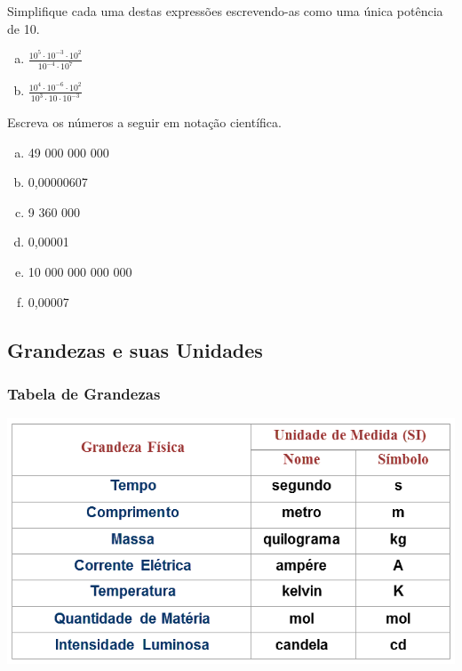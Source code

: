 \item Simplifique cada uma destas expressões escrevendo-as como uma única potência de 10.
\begin{multicols}{2}
\begin{enumerate}[a)]
	\item $\displaystyle\frac{10^5\cdot 10^{-3}\cdot 10^2}{10^{-4}\cdot 10^7}$
	\item $\displaystyle\frac{10^4\cdot 10^{-6}\cdot 10^2}{10^{3}\cdot 10\cdot 10^{-3}}$
\end{enumerate}
\end{multicols}

\item Escreva os números a seguir em notação científica.
\begin{multicols}{3}
\begin{enumerate}[a)]
	\item 49 000 000 000
	\item 0,00000607
	\item 9 360 000
	\item 0,00001
	\item 10 000 000 000 000
	\item 0,00007
\end{enumerate}
\end{multicols}

\subsection{Grandezas e suas Unidades}
\subsubsection{Tabela de Grandezas}
\includegraphics[scale=1]{figuras/tabela_grandeza_unidade.png}

